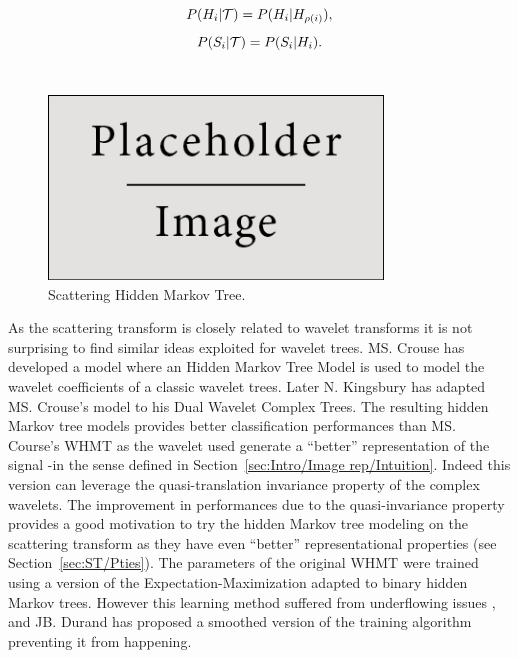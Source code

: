 \documentclass[a4paper,11pt]{report}
\begin{document}
    \begin{equation}
      P(H_{i} |\mathcal{T}) = P(H_{i} | H_{\rho(i)}),
      \label{eq:SCHMT - hypo 1}
    \end{equation}    
    \begin{equation}
      P(S_{i} |\mathcal{T}) = P(S_{i} | H_{i}).
      \label{eq:SCHMT - hypo 2}
    \end{equation} \\
    
		\begin{figure}
				\begin{center}
					\includegraphics[width=3.5in]{placeholder.jpg}
					\caption{Scattering Hidden Markov Tree.} %
					\label{fig:SCHMT 1}
				\end{center}
		\end{figure}
		
		As the scattering transform is closely related to wavelet transforms it is not surprising to find similar ideas exploited for wavelet trees. MS. Crouse has developed a model where an Hidden Markov Tree Model is used to model the wavelet coefficients \cite{crouse1998wavelet} of a classic wavelet trees. Later N. Kingsbury \cite{kingsbury2001complex} has  adapted MS. Crouse's model to his Dual Wavelet Complex Trees. The resulting hidden Markov tree models provides better classification performances than MS. Course's WHMT as the wavelet used generate a ``better'' representation of the signal -in the sense defined in Section~\ref{sec:Intro/Image rep/Intuition}. Indeed this version can leverage the quasi-translation invariance property of the complex wavelets. The improvement in performances due to the quasi-invariance property provides a good motivation to try the hidden Markov tree modeling on the scattering transform as they have even ``better'' representational properties (see Section~\ref{sec:ST/Pties}). The parameters of the original WHMT were trained using a version of the Expectation-Maximization adapted to binary hidden Markov trees. However this learning method suffered from underflowing issues \cite{devijver1985baum}, and JB. Durand \cite{durand2004computational} has proposed a smoothed version of the training algorithm preventing it from happening.\\
   
\end{document}
